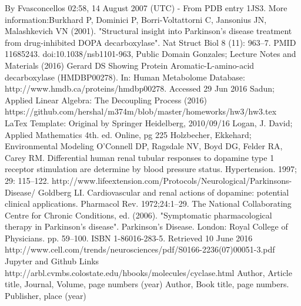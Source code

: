 \documentclass[smallextended]{svjour3}
\begin{document}
\begin{thebibliography}{}
By Fvasconcellos 02:58, 14 August 2007 (UTC) - From PDB entry 1JS3. More information:Burkhard P, Dominici P, Borri-Voltattorni C, Jansonius JN, Malashkevich VN (2001). "Structural insight into Parkinson's disease treatment from drug-inhibited DOPA decarboxylase". Nat Struct Biol 8 (11): 963–7. PMID 11685243. doi:10.1038/nsb1101-963, Public Domain
Gonzales; Lecture Notes and Materials (2016)
Gerard DS Showing Protein Aromatic-L-amino-acid decarboxylase (HMDBP00278). In: Human Metabolome Database: http://www.hmdb.ca/proteins/hmdbp00278. Accessed 29 Jun 2016
Sadun; Applied Linear Algebra: The Decoupling Process (2016)      %
https://github.com/hershal/m374m/blob/master/homeworks/hw3/hw3.tex
LaTex Template: Original by Springer Heidelberg, 2010/09/16
Logan, J. David; Applied Mathematics 4th. ed. Online, pg 225     %
Holzbecher, Ekkehard; Environmental Modeling                     %
O’Connell DP, Ragsdale NV, Boyd DG, Felder RA, Carey RM. Differential human renal tubular responses to dopamine type 1 receptor stimulation are determine by blood pressure status. Hypertension. 1997; 29: 115–122.
http://www.lifeextension.com/Protocols/Neurological/Parkinsons-Disease/
Goldberg LI. Cardiovascular and renal actions of dopamine: potential clinical applications. Pharmacol Rev. 1972;24:1–29.
The National Collaborating Centre for Chronic Conditions, ed. (2006). "Symptomatic pharmacological therapy in Parkinson’s disease". Parkinson's Disease. London: Royal College of Physicians. pp. 59–100. ISBN 1-86016-283-5. Retrieved 10 June 2016
http://www.cell.com/trends/neurosciences/pdf/S0166-2236(07)00051-3.pdf
Jupyter and Github Links
http://arbl.cvmbs.colostate.edu/hbooks/molecules/cyclase.html
%
Author, Article title, Journal, Volume, page numbers (year)
Author, Book title, page numbers. Publisher, place (year)
\end{thebibliography}
\end{document}

